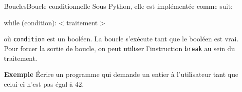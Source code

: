 \documentclass[10pt]{beamer}
\begin{document}
\begin{frame}[fragile]{Boucles}{Boucle conditionnelle}
	Sous Python, elle est implémentée comme suit:\begin{semiverbatim}while (condition):
    < traitement >\end{semiverbatim}
	où \verb|condition| est un booléen. La boucle s'exécute tant que le booléen est vrai.
	Pour forcer la sortie de boucle, on peut utiliser l'instruction \verb|break| au sein du traitement.
	
	\begin{block}{\textbf{Exemple}}
		Écrire un programme qui demande un entier à l'utilisateur tant que celui-ci n'est pas égal à $42$.
	\end{block}
\end{frame}
\end{document}
